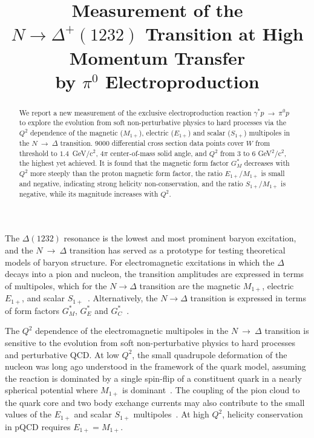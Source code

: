 \documentclass[aps,prl,twocolumn,superscriptaddress]{revtex4}
\begin{document}
\title{\large Measurement of the $N\to \Delta^+(1232)$ 
              Transition at High Momentum Transfer \\
              by $\pi^0$ Electroproduction }



\begin{abstract}
 We report a new measurement of the exclusive electroproduction reaction  
 $\gamma^*p~\to~\pi^0 p$ to explore the evolution from soft non-perturbative 
 physics to hard processes via the $Q^2$ dependence of the magnetic 
 ($M_{1+}$), electric ($E_{1+}$) and scalar ($S_{1+}$) multipoles in the  
 $N~\to~\Delta$ transition. 9000 differential cross section 
 data points cover $W$ from threshold to $1.4$~GeV/c$^2$, $4\pi$ 
 center-of-mass solid angle, and $Q^2$ from $3$ to $6$ GeV$^2$/c$^2$, 
 the highest yet achieved. 
 It is found that the magnetic form factor $G^*_M$ decreases 
 with $Q^2$ more steeply than the proton magnetic form factor, the ratio
 $E_{1+}/M_{1+}$ is small and negative, indicating strong 
 helicity non-conservation, and the ratio $S_{1+}/M_{1+}$ is negative, 
 while its magnitude increases with $Q^2$. 
\end{abstract}


\maketitle

The $\Delta(1232)$  resonance is the lowest and most prominent baryon 
excitation, and  the $N~\to~\Delta$ transition has served as a prototype 
for testing theoretical models of baryon structure. For electromagnetic 
excitations in which the $\Delta$ decays into a pion and nucleon, the 
transition amplitudes are expressed in terms of multipoles, which for 
the $N\to\Delta$ transition are the magnetic $M_{1+}$, electric 
$E_{1+}$, and scalar $S_{1+}$~\cite{bib:CGLN}. Alternatively, 
the $N\to\Delta$ transition is expressed in terms of form factors $G^*_M$, 
$G^*_E$ and $G^*_C$~\cite{bib:Jones-Scadron}. 

The $Q^2$ dependence of the electromagnetic multipoles in the $N~\to~\Delta$ 
transition is sensitive to the evolution from soft non-perturbative physics 
to hard processes and perturbative QCD. At low $Q^2$, the small quadrupole 
deformation of the nucleon was long ago understood in the framework of the 
quark model, assuming the reaction is dominated by a single spin-flip of a 
constituent quark in a nearly spherical potential where  $M_{1+}$ is 
dominant~\cite{bib:morpurgo, bib:isgur}. The coupling of the pion cloud to 
the quark core and two body exchange currents may also contribute to the 
small values of the $E_{1+}$ and scalar $S_{1+}$ 
multipoles~\cite{bib:Kamalov-Yang, bib:Buch}. At high $Q^2$, helicity 
conservation in pQCD requires $E_{1+} = M_{1+}$.  
\end{document}
